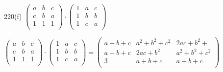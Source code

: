\begin{problem}{220(f)}
$\left(
\begin{array}{rrr}
a & b & c \\
c & b & a \\
1 & 1 & 1 \\
\end{array}
\right)
\cdot
\left(
\begin{array}{rrr}
1 & a & c \\
1 & b & b \\
1 & c & a \\
\end{array}
\right)
$

\end{problem}
\begin{solution}
\ensuremath{
\begin{pmatrix}
	a & b & c \\ c & b & a \\ 1 & 1 & 1 \\
\end{pmatrix} \cdot
\begin{pmatrix}
	1 & a & c \\ 1 & b & b \\ 1 & c & a \\
\end{pmatrix} = 
\begin{pmatrix}
	a+b+c & a^2+b^2+c^2 & 2ac+b^2+\\
	a+b+c & 2ac+b^2     & a^2+b^2+c^2\\
	3     & a+b+c       & a+b+c\\
\end{pmatrix}
}\\
\end{solution} 

